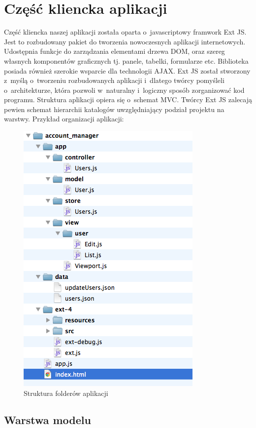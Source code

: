 \chapter{Część kliencka aplikacji}

Część kliencka naszej aplikacji została oparta o~javascriptowy framwork Ext JS. Jest to rozbudowany pakiet do tworzenia nowoczesnych aplikacji internetowych. Udostępnia funkcje do zarządzania elementami drzewa DOM, oraz szereg własnych komponentów graficznych tj. panele, tabelki, formularze etc. Biblioteka posiada również szerokie wsparcie dla technologii AJAX. Ext JS został stworzony z~myślą o~tworzeniu rozbudowanych aplikacji i~dlatego twórcy pomyśleli o~architekturze, która pozwoli w~naturalny i~logiczny sposób zorganizować kod programu. Struktura aplikacji opiera się o~schemat MVC. Twórcy Ext JS zalecają pewien schemat hierarchii katalogów uwzględniający podział projektu na warstwy. Przykład organizacji aplikacji:

\begin{figure}[H]
	\centering
	\includegraphics[scale=0.5]{images/struktura_folderow.png}
	\caption{Struktura folderów aplikacji}
\end{figure}

\section{Warstwa modelu}

